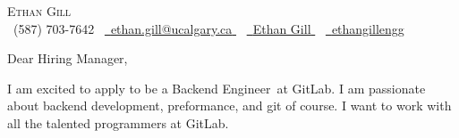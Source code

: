 
\newcommand{\userName}{Ethan Gill}
\newcommand{\userFullName}{Ethan Gill}
\newcommand{\userPhone}{(587) 703-7642}
\newcommand{\userEmail}{ethan.gill@ucalgary.ca}
\newcommand{\userGithub}{ethangillengg}
\newcommand{\userLinkedIn}{https://www.linkedin.com/in/ethan-gill-008a00258/}
\newcommand{\currentUniversity}{the University of Calgary's Schulich School of Engineering}
\newcommand{\companyName}{GitLab}
\newcommand{\jobTitle}{Backend Engineer}
\newcommand{\introTopics}{backend development, preformance, and git of course}
\newcommand{\whyMePersonalized}{More recently I have taken to “Git-ifying” my life as much as possible. I use it for my notes, resume (in LaTeX), projects, etc. I believe Git is an extremely powerful tool that has so many different use cases. I would be ecstatic to learn Git in even more depth at \companyName.

	\par
	During my coding journey, I have had the wonderful opportunity to work on multiple internships, each with their own unique technical challenges. At my current position, I have been working on developing solutions in Vue.js for clients. Due to this prior experience with Vue.js, I will be able to hit the ground running at \companyName’s frontend team.
}



\begin{center}
	{\Huge \scshape \userFullName} \\
	\small \raisebox{-0.1\height}\faPhone\ \userPhone ~
	\href{mailto:\userEmail}{
		\raisebox{-0.2\height}\faEnvelope\  \underline{\userEmail}
	} ~
	\href{\userLinkedIn}{
		\raisebox{-0.2\height}\faLinkedin\ \underline{\userName}
	} ~
	\href{https://github.com/\userGithub}{
		\raisebox{-0.2\height}\faGithub\ \underline{\userGithub}
	}
\end{center}

\vspace{8pt}

\noindent{}\Large{Dear Hiring Manager,}

\par{}

I am excited to apply to be a \jobTitle~at \companyName. I am passionate about \introTopics. I want to work with all the talented programmers at \companyName.

